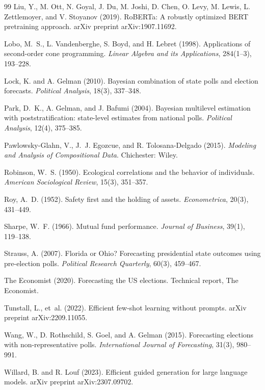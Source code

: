 \documentclass[12pt, letterpaper]{article}
\theoremstyle{definition}
\begin{document}
\begin{thebibliography}{99}
Liu, Y., M. Ott, N. Goyal, J. Du, M. Joshi, D. Chen, O. Levy, M. Lewis,
  L. Zettlemoyer, and V. Stoyanov (2019).
\newblock RoBERTa: A robustly optimized BERT pretraining approach.
\newblock arXiv preprint arXiv:1907.11692.

Lobo, M.~S., L. Vandenberghe, S. Boyd, and H. Lebret (1998).
\newblock Applications of second-order cone programming.
\newblock \textit{Linear Algebra and its Applications}, 284(1--3), 193--228.

Lock, K. and A. Gelman (2010).
\newblock Bayesian combination of state polls and election forecasts.
\newblock \textit{Political Analysis}, 18(3), 337--348.

Park, D.~K., A. Gelman, and J. Bafumi (2004).
\newblock Bayesian multilevel estimation with poststratification: state-level
  estimates from national polls.
\newblock \textit{Political Analysis}, 12(4), 375--385.

Pawlowsky-Glahn, V., J.~J. Egozcue, and R. Tolosana-Delgado (2015).
\newblock \textit{Modeling and Analysis of Compositional Data}.
\newblock Chichester: Wiley.

Robinson, W.~S. (1950).
\newblock Ecological correlations and the behavior of individuals.
\newblock \textit{American Sociological Review}, 15(3), 351--357.

Roy, A.~D. (1952).
\newblock Safety first and the holding of assets.
\newblock \textit{Econometrica}, 20(3), 431--449.

Sharpe, W.~F. (1966).
\newblock Mutual fund performance.
\newblock \textit{Journal of Business}, 39(1), 119--138.

Strauss, A. (2007).
\newblock Florida or Ohio? Forecasting presidential state outcomes using
  pre-election polls.
\newblock \textit{Political Research Quarterly}, 60(3), 459--467.

The Economist (2020).
\newblock Forecasting the US elections.
\newblock Technical report, The Economist.

Tunstall, L., et~al. (2022).
\newblock Efficient few-shot learning without prompts.
\newblock arXiv preprint arXiv:2209.11055.

Wang, W., D. Rothschild, S. Goel, and A. Gelman (2015).
\newblock Forecasting elections with non-representative polls.
\newblock \textit{International Journal of Forecasting}, 31(3), 980--991.

Willard, B. and R. Louf (2023).
\newblock Efficient guided generation for large language models.
\newblock arXiv preprint arXiv:2307.09702.

\end{thebibliography}
\end{document}
